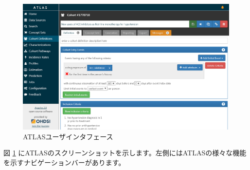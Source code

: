\documentclass[
  11pt]{book}
\theoremstyle{definition}
\theoremstyle{definition}
\theoremstyle{definition}
\theoremstyle{definition}
\theoremstyle{remark}
\begin{document}
\begin{figure}

{\centering \includegraphics[width=1\linewidth]{images/OhdsiAnalyticsTools/atlas} 

}

\caption{ATLASユーザインタフェース}\label{fig:atlas}
\end{figure}

図 \ref{fig:atlas} にATLASのスクリーンショットを示します。左側にはATLASの様々な機能を示すナビゲーションバーがあります。
\end{document}
